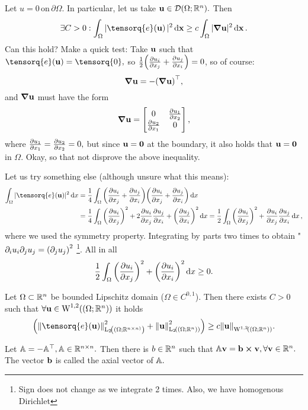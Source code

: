 \documentclass[11pt]{scrartcl} %
\begin{document}
\begin{example}
	Let $u=0 \, \text{on} \, \partial \Omega.$ In particular, let us take $\vb{u} \in \mathcal{D}\qty(\Omega; {\mathbb R}^n).$ Then
	\[
		\exists C>0: \int_{\Omega}|\tensorq{e}\qty(\vb{u})|^{2}\dd{\vb{x}} \geq c \int_{\Omega}|\grad \vb{u}|^{2}\dd{\vb{x}}.
	\]
	Can this hold? Make a quick test: Take $\vb{u}$ such that $\tensorq{e}\qty(\vb{u}) = \tensorq{0}, $ so $\frac{1}{2}\qty(\pdv{u_i}{x_j}+\pdv{u_j}{x_i}) = 0$, so of course:
	\[
		\grad \vb{u} = - \qty(\grad \vb{u})^\top,
	\]
	and $\grad \vb{u}$ must have the form
	\[
		\grad \vb{u} = \begin{bmatrix}
			0 & \pdv{u_1}{x_2} \\
			\pdv{u_2}{x_1} & 0
		\end{bmatrix},
	\]
	where $\pdv{u_1}{x_1} = \pdv{u_2}{x_2} = 0,$ but since $\vb{u} = \vb{0}$ at the boundary, it also holds that $\vb{u} = \vb{0}$ in $\Omega$. Okay, so that not disprove the above inequality.

	Let us try something else (although unsure what this means):
	\begin{align*}
		\int_{\Omega}|\tensorq{e}(\vb{u})|^{2}\dd{x} &= \frac{1}{4}\int_{\Omega}\qty(\pdv{u_i}{x_j}+\pdv{u_j}{x_i})\qty(\pdv{u_i}{x_j}+\pdv{u_j}{x_i})\dd{x} \\
								 &= \frac{1}{4} \int_{\Omega}\qty(\pdv{u_i}{x_j})^{2} + 2\pdv{u_i}{x_j}\pdv{u_j}{x_i} + \qty(\pdv{u_j}{x_i})^{2} \dd{x} = \frac{1}{2}\int_{\Omega}\qty(\pdv{u_i}{x_j})^{2}+ \pdv{u_i}{x_j}\pdv{u_j}{x_i}\dd{x},
	\end{align*}
	where we used the symmetry property. Integrating by parts two times to obtain "$\partial_{i}u_i \partial_{j}u_j = \qty(\partial_{j}u_j)^{2}$ \footnote{Sign does not change as we integrate 2 times. Also, we have homogenous Dirichlet}. All in all
	\[
		\frac{1}{2}\int_{\Omega}\qty(\pdv{u_i}{x_j})^{2} + \qty(\pdv{u_i}{x_i})^{2}\dd{x} \geq 0.
	\]
\end{example}
\begin{theorem}
Let $\Omega \subset {\mathbb R}^n$ be bounded Lipschitz domain ($\Omega \in C^{0,1}$). Then there exists $C>0$ such that $\forall \vb{u} \in \WkpSet[1][2]{\qty(\Omega;\R^n)}$ it holds
\[
\qty(\norm{\tensorq{e}\qty(\vb{u})}_{\LpSet[2]{(\Omega; \R^{n \times n)}}}^{2}+\norm{\vb{u}}_{\LpSet[2]{(\Omega; \R^n)}}^{2}) \geq c \norm{\vb{u}}_{\WkpSet[1][2]{(\Omega;\R^n)}}.
\]
\end{theorem}


\begin{definition}
	Let $\mathbb{A} = - \mathbb{A}^\top, \mathbb{A} \in {\mathbb R}^{n \times n}.$ Then there is $b \in {\mathbb R}^n$ such that $\mathbb{A} \vb{v} = \vb{b} \cross \vb{v}, \forall \vb{v} \in {\mathbb R}^n.$ The vector $\vb{b}$ is called the axial vector of $\mathbb{A}.$
\end{definition}
\end{document}
